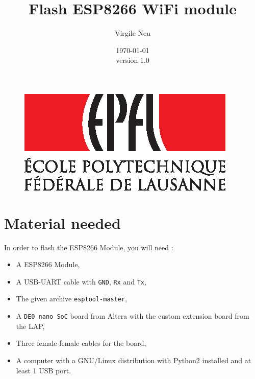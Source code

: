 \documentclass[11pt]{article}
\title{\textbf{Flash ESP8266 WiFi module}}
\author{Virgile Neu}
\date{\today \\ version 1.0}
\begin{document}
\maketitle
\begin{figure}
\center
\includegraphics[scale=0.9]{EPFL-Logo-CMJN.eps}
\end{figure}
\newpage
\newpage

\setcounter{page}{1}
\rfoot{\thepage}

\section{Material needed}
In order to flash the ESP8266 Module, you will need :
\begin{itemize}
\item A ESP8266 Module,
\item A USB-UART cable with \texttt{GND}, \texttt{Rx} and \texttt{Tx},
\item The given archive \texttt{esptool-master},
\item A \texttt{DE0\_nano SoC} board from Altera with the custom extension board from the LAP,
\item Three female-female cables for the board,
\item A computer with a GNU/Linux distribution with Python2 installed and at least 1 USB port.
\end{itemize}
\end{document}
